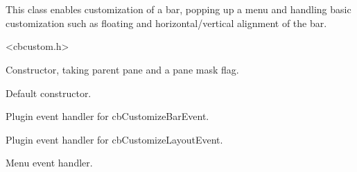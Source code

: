 %
%


\section{}\label{cbsimplecustomizationplugin}


This class enables customization of a bar, popping up a
menu and handling basic customization such as floating
and horizontal/vertical alignment of the bar.




<cbcustom.h>




\label{cbsimplecustomizationplugincbsimplecustomizationplugin}


Constructor, taking parent pane and a pane mask flag.



Default constructor.


\label{cbsimplecustomizationpluginoncustomizebar}


Plugin event handler for cbCustomizeBarEvent.


\label{cbsimplecustomizationpluginoncustomizelayout}


Plugin event handler for cbCustomizeLayoutEvent.


\label{cbsimplecustomizationpluginonmenuitemselected}


Menu event handler.

